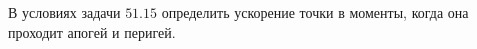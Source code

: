 В условиях задачи $51.15$ определить ускорение точки в моменты, когда
она проходит апогей и перигей.
